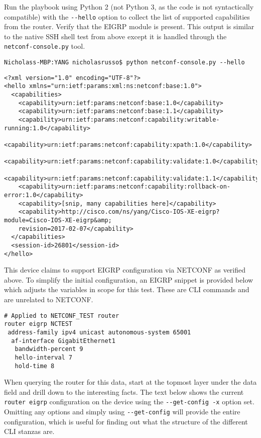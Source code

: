 Run the playbook using Python 2 (not Python 3, as the code is not
syntactically compatible) with the \verb|--hello| option to collect the list of
supported capabilities from the router. Verify that the EIGRP module is
present. This output is similar to the native SSH shell test from above except
it is handled through the \verb|netconf-console.py| tool.

\begin{verbatim}
Nicholass-MBP:YANG nicholasrusso$ python netconf-console.py --hello
\end{verbatim}

\begin{verbatim}
<?xml version="1.0" encoding="UTF-8"?>
<hello xmlns="urn:ietf:params:xml:ns:netconf:base:1.0">
  <capabilities>
    <capability>urn:ietf:params:netconf:base:1.0</capability>
    <capability>urn:ietf:params:netconf:base:1.1</capability>
    <capability>urn:ietf:params:netconf:capability:writable-running:1.0</capability>
    <capability>urn:ietf:params:netconf:capability:xpath:1.0</capability>
    <capability>urn:ietf:params:netconf:capability:validate:1.0</capability>
    <capability>urn:ietf:params:netconf:capability:validate:1.1</capability>
    <capability>urn:ietf:params:netconf:capability:rollback-on-error:1.0</capability>
    <capability>[snip, many capabilities here]</capability>
    <capability>http://cisco.com/ns/yang/Cisco-IOS-XE-eigrp?module=Cisco-IOS-XE-eigrp&amp;
	revision=2017-02-07</capability>
  </capabilities>
  <session-id>26801</session-id>
</hello>
\end{verbatim}

This device claims to support EIGRP configuration via NETCONF as verified
above. To simplify the initial configuration, an EIGRP snippet is provided
below which adjusts the variables in scope for this test. These are CLI
commands and are unrelated to NETCONF.

\begin{verbatim}
# Applied to NETCONF_TEST router
router eigrp NCTEST
 address-family ipv4 unicast autonomous-system 65001
  af-interface GigabitEthernet1
   bandwidth-percent 9
   hello-interval 7
   hold-time 8
\end{verbatim}

When querying the router for this data, start at the topmost layer under the
data field and drill down to the interesting facts. The text below shows the
current \verb|router eigrp| configuration on the device using the \verb|--get-config -x|
option set. Omitting any options and simply using \verb|--get-config| will provide
the entire configuration, which is useful for finding out what the structure
of the different CLI stanzas are.

